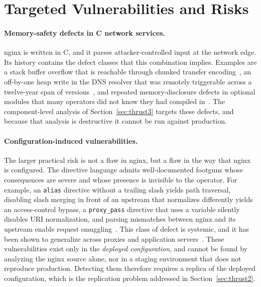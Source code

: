 \section{Targeted Vulnerabilities and Risks}
\label{sec:landscape}

\paragraph{Memory-safety defects in C network services.}
nginx is written in C, and it parses attacker-controlled input at the network
edge. Its history contains the defect classes that this combination implies. Examples
are a stack buffer overflow that is reachable through chunked transfer
encoding~\cite{cve2013:nginx}, an off-by-one heap write in the DNS resolver
that was remotely triggerable across a twelve-year span of
versions~\cite{cve2021:resolver}, and repeated memory-disclosure defects in
optional modules that many operators did not know they had compiled
in~\cite{cve2022:mp4}. The component-level analysis of Section~\ref{sec:thrust3} targets these
defects, and because that analysis is destructive it cannot be run against
production.

\paragraph{Configuration-induced vulnerabilities.}
The larger practical risk is not a flaw in nginx, but a flaw in the way that
nginx is configured. The directive language admits well-documented footguns
whose consequences are severe and whose presence is invisible to the
operator. For example, an \texttt{alias} directive without a trailing slash
yields path traversal, disabling slash merging in front of an upstream that
normalizes differently yields an access-control bypass, a
\texttt{proxy\_pass} directive that uses a variable silently disables URI
normalization, and parsing mismatches between nginx and its upstream enable
request smuggling~\cite{cve2019:smuggling}. This class of defect is systemic, and it has been shown to generalize across
proxies and application servers~\cite{orangetsai}. These vulnerabilities exist only in the \emph{deployed configuration}, and
cannot be found by analyzing the nginx source alone, nor in a staging
environment that does not reproduce production. Detecting them therefore
requires a replica of the deployed configuration, which is the replication
problem addressed in Section~\ref{sec:thrust2}.


